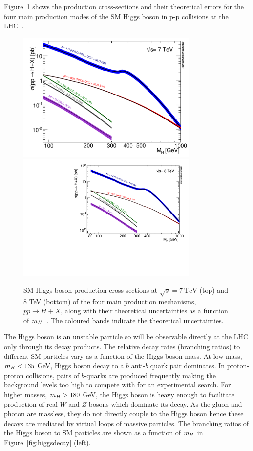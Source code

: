Figure~\ref{fig:higgsprod} shows the production cross-sections and their theoretical 
errors for the four main production modes of the SM Higgs boson in  
p-p collisions at the LHC~\citep{lhcxswg2011,lhcxswg2012}.
\begin{figure}[hbtp!]
\begin{center}
\includegraphics[width=0.8\textwidth]{theory/pheno/Higgs_XS_7TeV.pdf}\\
\includegraphics[width=0.8\textwidth]{theory/pheno/Higgs_XS_8TeV_lx.pdf}
\caption{SM Higgs boson production cross-sections at $\sqrt{s}=7~\mathrm{TeV}$ (top)
and 8 TeV (bottom) of the four main production mechanisms, $pp\rightarrow H+X$,
along with their theoretical uncertainties as a function of 
$m_{H}$~\citep{lhcxswg2011,lhcxswg2012}. The coloured bands indicate the theoretical
uncertainties.}
\label{fig:higgsprod}
\end{center}
\end{figure}
The Higgs boson is an unstable particle so will be observable directly at the LHC
only through its decay products. The relative decay rates (branching ratios) to 
different SM particles vary as a function of the Higgs boson mass.
At low mass, $m_{H}<135$ GeV, Higgs boson decay to a $b$ anti-$b$ quark pair
dominates. In proton-proton collisions, pairs of $b$-quarks are produced 
frequently making the background levels too high to compete with for an experimental
search. For higher masses, $m_{H}>180$ GeV, the Higgs boson is heavy enough
to facilitate production of real $W$ and $Z$ bosons which dominate its decay.
As the gluon and photon are massless, they do not directly couple to the Higgs boson
hence these decays are mediated by virtual loops of massive particles.
The branching ratios of the Higgs boson to SM particles are shown as a function
of $m_{H}$ in Figure~\ref{fig:higgsdecay} (left).

